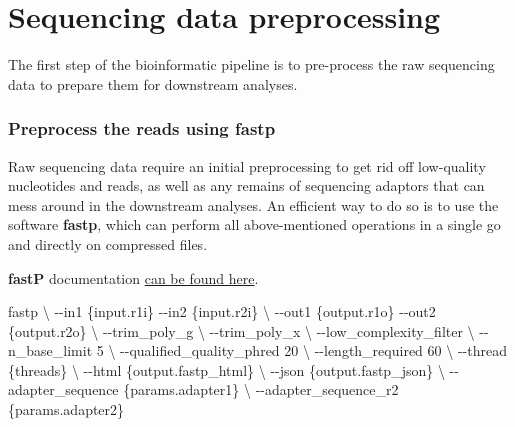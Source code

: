 \documentclass[
]{book}
\newenvironment{Shaded}{\begin{snugshade}}{\end{snugshade}}
\newcommand{\AttributeTok}[1]{\textcolor[rgb]{0.13,0.29,0.53}{#1}}
\newcommand{\DataTypeTok}[1]{\textcolor[rgb]{0.13,0.29,0.53}{#1}}
\newcommand{\ExtensionTok}[1]{#1}
\newcommand{\NormalTok}[1]{#1}
\begin{document}
\normalsize

\hypertarget{sequencing-data-preprocessing}{%
\chapter{Sequencing data preprocessing}\label{sequencing-data-preprocessing}}

The first step of the bioinformatic pipeline is to pre-process the raw sequencing data to prepare them for downstream analyses.

\hypertarget{preprocess-the-reads-using-fastp}{%
\subsection*{Preprocess the reads using fastp}\label{preprocess-the-reads-using-fastp}}

Raw sequencing data require an initial preprocessing to get rid off low-quality nucleotides and reads, as well as any remains of sequencing adaptors that can mess around in the downstream analyses. An efficient way to do so is to use the software \textbf{fastp}, which can perform all above-mentioned operations in a single go and directly on compressed files.

\textbf{fastP} documentation \href{https://github.com/OpenGene/fastp}{can be found here}.

\small

\begin{Shaded}
\begin{Highlighting}[]
\ExtensionTok{fastp} \DataTypeTok{\textbackslash{}}
    \AttributeTok{{-}{-}in1}\NormalTok{ \{input.r1i\} }\AttributeTok{{-}{-}in2}\NormalTok{ \{input.r2i\} }\DataTypeTok{\textbackslash{}}
    \AttributeTok{{-}{-}out1}\NormalTok{ \{output.r1o\} }\AttributeTok{{-}{-}out2}\NormalTok{ \{output.r2o\} }\DataTypeTok{\textbackslash{}}
    \AttributeTok{{-}{-}trim\_poly\_g} \DataTypeTok{\textbackslash{}}
    \AttributeTok{{-}{-}trim\_poly\_x} \DataTypeTok{\textbackslash{}}
    \AttributeTok{{-}{-}low\_complexity\_filter} \DataTypeTok{\textbackslash{}}
    \AttributeTok{{-}{-}n\_base\_limit}\NormalTok{ 5 }\DataTypeTok{\textbackslash{}}
    \AttributeTok{{-}{-}qualified\_quality\_phred}\NormalTok{ 20 }\DataTypeTok{\textbackslash{}}
    \AttributeTok{{-}{-}length\_required}\NormalTok{ 60 }\DataTypeTok{\textbackslash{}}
    \AttributeTok{{-}{-}thread}\NormalTok{ \{threads\} }\DataTypeTok{\textbackslash{}}
    \AttributeTok{{-}{-}html}\NormalTok{ \{output.fastp\_html\} }\DataTypeTok{\textbackslash{}}
    \AttributeTok{{-}{-}json}\NormalTok{ \{output.fastp\_json\} }\DataTypeTok{\textbackslash{}}
    \AttributeTok{{-}{-}adapter\_sequence}\NormalTok{ \{params.adapter1\} }\DataTypeTok{\textbackslash{}}
    \AttributeTok{{-}{-}adapter\_sequence\_r2}\NormalTok{ \{params.adapter2\}}
\end{Highlighting}
\end{Shaded}
\end{document}
